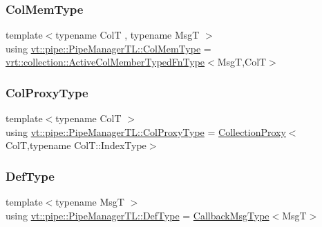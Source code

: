 \mbox{\label{structvt_1_1pipe_1_1_pipe_manager_t_l_abf7ad21be4f3d0db51d643aa8ea959cc}} 
\subsubsection{\texorpdfstring{Col\+Mem\+Type}{ColMemType}}
{\footnotesize\ttfamily template$<$typename ColT , typename MsgT $>$ \\
using \hyperlink{structvt_1_1pipe_1_1_pipe_manager_t_l_abf7ad21be4f3d0db51d643aa8ea959cc}{vt\+::pipe\+::\+Pipe\+Manager\+T\+L\+::\+Col\+Mem\+Type} =  \hyperlink{namespacevt_1_1vrt_1_1collection_a87925616c03cf4ccc548d33b2fe172ee}{vrt\+::collection\+::\+Active\+Col\+Member\+Typed\+Fn\+Type}$<$MsgT,ColT$>$}

\mbox{\label{structvt_1_1pipe_1_1_pipe_manager_t_l_af56c58cad882496e35f01227d4da3898}} 
\subsubsection{\texorpdfstring{Col\+Proxy\+Type}{ColProxyType}}
{\footnotesize\ttfamily template$<$typename ColT $>$ \\
using \hyperlink{structvt_1_1pipe_1_1_pipe_manager_t_l_af56c58cad882496e35f01227d4da3898}{vt\+::pipe\+::\+Pipe\+Manager\+T\+L\+::\+Col\+Proxy\+Type} =  \hyperlink{namespacevt_a0d58a693bfb96e0ce5d145692a1a1f98}{Collection\+Proxy}$<$ColT,typename Col\+T\+::\+Index\+Type$>$}

\mbox{\label{structvt_1_1pipe_1_1_pipe_manager_t_l_a5f78dde989930cf645a8bd67301740a7}} 
\subsubsection{\texorpdfstring{Def\+Type}{DefType}}
{\footnotesize\ttfamily template$<$typename MsgT $>$ \\
using \hyperlink{structvt_1_1pipe_1_1_pipe_manager_t_l_a5f78dde989930cf645a8bd67301740a7}{vt\+::pipe\+::\+Pipe\+Manager\+T\+L\+::\+Def\+Type} =  \hyperlink{structvt_1_1pipe_1_1_pipe_manager_t_l_af6fc2c17f1729fa06450441b0ee81cb1}{Callback\+Msg\+Type}$<$MsgT$>$}

